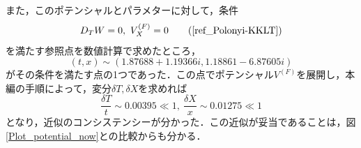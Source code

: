 \documentclass[a4paper,uplatex,dvipdfmx]{jsarticle}
\theoremstyle{definition}
\begin{document}
また，このポテンシャルとパラメターに対して，条件
\begin{equation}
   D_{T}W
   =
   0
   ,\ 
   V^{(F)}_{X}
   =
   0
   \tag*{(\ref{ref_Polonyi-KKLT})}
\end{equation}
を満たす参照点を数値計算で求めたところ，
\begin{equation}
   (t,x)
   \sim
   (1.87688+1.19366i,1.18861 -6.87605i)
   \nonumber
\end{equation}
がその条件を満たす点の1つであった．この点でポテンシャル$V^{(F)}$を展開し，本編の手順によって，変分$\delta T,\delta X$を求めれば
\begin{equation}
   \frac{\delta T}{t}
   \sim
   0.00395
   \ll
   1
   ,\ 
   \frac{\delta X}{x}
   \sim
   0.01275
   \ll
   1
   \nonumber
\end{equation}
となり，近似のコンシステンシーが分かった．この近似が妥当であることは，図\ref{Plot_potential_now}との比較からも分かる．


\clearpage



\nocite{柴崎_背景_2021}
\nocite{中野_磁化_2023}
\end{document}
